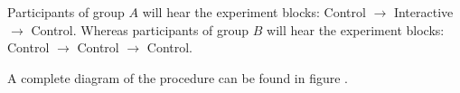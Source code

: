 Participants of group $A$ will hear the experiment blocks: Control $\rightarrow$ Interactive $\rightarrow$ Control. Whereas participants of group $B$ will hear the experiment blocks: Control $\rightarrow$ Control $\rightarrow$ Control.

A complete diagram of the procedure can be found in figure .